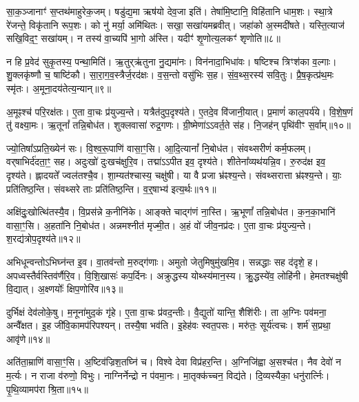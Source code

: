 सा॒क॒ञ्जानाꣳ॑ स॒प्तथ॑माहुरेक॒जम्। षडु॑द्य॒मा ऋष॑यो देव॒जा इति॑। 
तेषा॑मि॒ष्टानि॒ विहि॑तानि धाम॒शः। स्था॒त्रे रे॑जन्ते॒ विकृ॑तानि रूप॒शः। 
को नु॑ मर्या॒ अमि॑थितः। सखा॒ सखा॑यमब्रवीत्। 
जहा॑को अ॒स्मदी॑षते। यस्ति॒त्याज॑ सखि॒विद॒ꣳ॒ सखा॑यम्। 
न तस्य॑ वा॒च्यपि॑ भा॒गो अ॑स्ति। यदीꣳ॑ शृ॒णोत्य॒लकꣳ॑ शृणोति॥८॥\ip

न हि प्र॒वेद॑ सुकृ॒तस्य॒ पन्था॒मिति॑। ऋ॒तुर्‌ऋ॑तुना नु॒द्यमा॑नः। 
विन॑नादा॒\-भिधा॑वः। षष्टिश्च त्रिꣳश॑का व॒ल्गाः। 
शु॒क्लकृ॑ष्णौ च॒ षाष्टि॑कौ। सा॒रा॒ग॒व॒स्त्रैर्ज॒र\-द॑क्षः। 
व॒स॒न्तो वसु॑भिः स॒ह। सं॒व॒थ्स॒रस्य॑ सवि॒तुः। 
प्रै॒ष॒कृत्प्र॑थ॒मः स्मृ॑तः। अ॒मूना॒दय॑तेत्य॒न्यान्॥९॥\ip

अ॒मूꣴश्च॑ परि॒रक्ष॑तः। ए॒ता वा॒चः प्र॑युज्य॒न्ते। 
यत्रैत॑दुप॒दृश्य॑ते। ए॒तदे॒व वि॑जानी॒यात्। 
प्र॒माणं॑ काल॒पर्य॑ये। वि॒शे॒ष॒णं तु॑ वक्ष्या॒मः। 
ऋ॒तूनां᳚ तन्नि॒बोध॑त। शुक्लवासा॑ रुद्र॒गणः। 
ग्री॒ष्मेणा॑\-ऽऽवर्त॒ते स॑ह। नि॒जह॑न्‌ पृथि॑वीꣳ स॒र्वाम्॥१०॥\ip

ज्यो॒तिषा᳚\-ऽप्रति॒ख्येन॑ सः। वि॒श्व॒रू॒पाणि॑ वासा॒ꣳ॒सि। 
आ॒दि॒त्यानां᳚ नि॒बोध॑त। संवथ्सरीणं॑ कर्म॒फलम्। 
वर्‌षाभिर्द॑दता॒ꣳ॒ सह। अदुःखो॑ दुःखच॑क्षुरि॒व। 
तद्मा॑\-ऽऽपीत इव॒ दृश्य॑ते। शीतेना᳚व्यथ॑यन्नि॒व। 
रु॒रुद॑क्ष इव॒ दृश्य॑ते। ह्लादयते᳚ ज्वल॑तश्चै॒व। 
शा॒म्यत॑श्चास्य॒ चक्षु॑षी। या वै प्रजा भ्र॑ꣴश्य॒न्ते। 
संवथ्सरात्ता भ्र॑ꣴश्य॒न्ते। याः॒ प्रति॑तिष्ठ॒न्ति। 
संवथ्सरे ताः प्रति॑तिष्ठ॒न्ति। व॒र्॒‌षाभ्य॑ इत्य॒र्थः॥११॥\ip\anuvakamend


अक्षि॑दुः॒खोत्थि॑तस्यै॒व। वि॒प्रस॑न्ने क॒नीनि॑के। 
आङ्क्ते चाद्ग॑णं ना॒स्ति। ऋ॒भूणां᳚ तन्नि॒बोध॑त। 
क॒न॒का॒भानि॑ वासा॒ꣳ॒सि। अ॒हता॑नि नि॒बोध॑त। 
अन्नमश्नीत॑ मृज्मी॒त। अ॒हं वो॑ जीव॒नप्र॑दः। 
ए॒ता वा॒चः प्र॑युज्य॒न्ते। श॒रद्य॑त्रोप॒दृश्य॑ते॥१२॥\ip

अभिधून्वन्तो\-ऽभिघ्न॑न्त इ॒व। वा॒तव॑न्तो म॒रुद्ग॑णाः। 
अमुतो जेतुमिषुमु॑खमि॒व। सन्नद्धाः सह द॑दृशे॒ ह। 
अपध्वस्तैर्वस्तिव॑र्णैरि॒व। वि॒शि॒खासः॑ कप॒र्दिनः। 
अक्रुद्धस्य योथ्स्य॑मान॒स्य। क्रु॒द्धस्ये॑व॒ लोहि॑नी। 
हेमतश्चक्षु॑षी वि॒द्यात्। अ॒क्ष्णयोः᳚ क्षिप॒णोरि॑व॥१३॥\ip

दुर्भिक्षं देव॑लोके॒षु। म॒नूना॑मुद॒कं गृ॑हे। 
ए॒ता वा॒चः प्र॑वद॒न्तीः। वै॒द्युतो॑ यान्ति॒ शैशि॑रीः। 
ता अ॒ग्निः पव॑मना॒ अन्वै᳚क्षत। इ॒ह जी॑वि॒कामप॑रिपश्यन्। 
तस्यै॒षा भव॑ति। इ॒हेह॑वः स्वत॒पसः। 
मरु॑तः॒ सूर्य॑त्वचः। शर्म॑ स॒प्रथा॒ आवृ॑णे॥१४॥\ip\anuvakamend


अति॑ता॒म्राणि॑ वासा॒ꣳ॒सि। अ॒ष्टिव॑ज्रिश॒तघ्नि॑ च। 
विश्वे देवा विप्र॑हर॒न्ति। अ॒ग्निजि॑ह्वा अ॒सश्च॑त। 
नैव देवो॑ न म॒र्त्यः। न राजा व॑रुणो॒ विभुः। 
नाग्निर्नेन्द्रो न प॑वमा॒नः। मा॒तृक्क॑च्चन॒ विद्य॑ते। 
दि॒व्यस्यैका॒ धनु॑रार्त्निः। पृ॒थि॒व्यामप॑रा श्रि॒ता॥१५॥\ip

